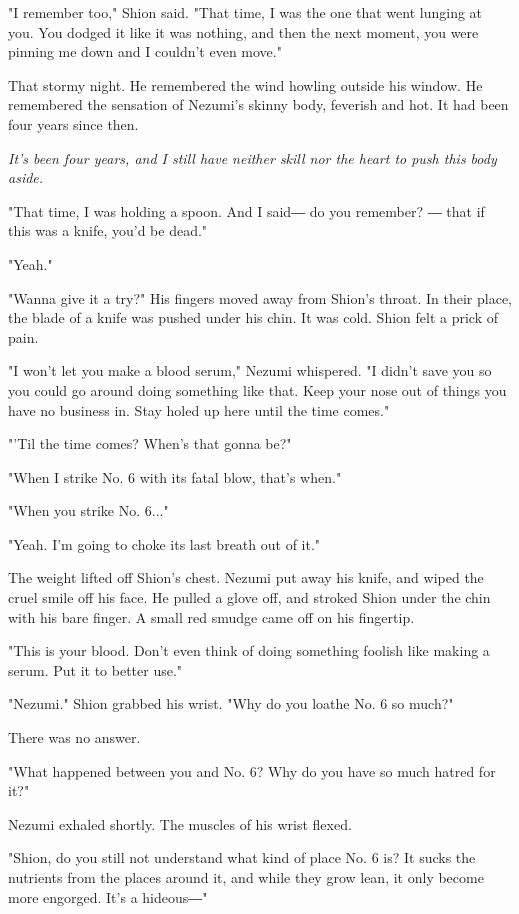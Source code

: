 "I remember too," Shion said. "That time, I was the one that went
lunging at you. You dodged it like it was nothing, and then the next
moment, you were pinning me down and I couldn't even move."

That stormy night. He remembered the wind howling outside his window. He
remembered the sensation of Nezumi's skinny body, feverish and hot. It
had been four years since then.

\emph{It's been four years, and I still have neither skill nor the heart to
push this body aside.}

"That time, I was holding a spoon. And I said― do you remember? ― that
if this was a knife, you'd be dead."

"Yeah."

"Wanna give it a try?" His fingers moved away from Shion's throat. In
their place, the blade of a knife was pushed under his chin. It was
cold. Shion felt a prick of pain.

"I won't let you make a blood serum," Nezumi whispered. "I didn't save
you so you could go around doing something like that. Keep your nose out
of things you have no business in. Stay holed up here until the time
comes."

"'Til the time comes? When's that gonna be?"

"When I strike No. 6 with its fatal blow, that's when."

"When you strike No. 6..."

"Yeah. I'm going to choke its last breath out of it."

The weight lifted off Shion's chest. Nezumi put away his knife, and
wiped the cruel smile off his face. He pulled a glove off, and stroked
Shion under the chin with his bare finger. A small red smudge came off
on his fingertip.

"This is your blood. Don't even think of doing something foolish like
making a serum. Put it to better use."

"Nezumi." Shion grabbed his wrist. "Why do you loathe No. 6 so much?"

There was no answer.

"What happened between you and No. 6? Why do you have so much hatred for
it?"

Nezumi exhaled shortly. The muscles of his wrist flexed.

"Shion, do you still not understand what kind of place No. 6 is? It
sucks the nutrients from the places around it, and while they grow lean,
it only become more engorged. It's a hideous―"

